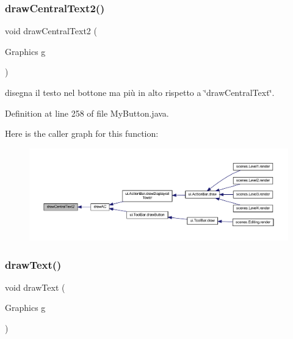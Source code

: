 \subsubsection{\texorpdfstring{draw\+Central\+Text2()}{drawCentralText2()}}
{\footnotesize\ttfamily void draw\+Central\+Text2 (\begin{DoxyParamCaption}\item[{Graphics}]{g }\end{DoxyParamCaption})\hspace{0.3cm}{\ttfamily [private]}}



disegna il testo nel bottone ma più in alto rispetto a \char`\"{}draw\+Central\+Text\char`\"{}. 



Definition at line 258 of file My\+Button.\+java.

Here is the caller graph for this function\+:\nopagebreak
\begin{figure}[H]
\begin{center}
\leavevmode
\includegraphics[width=350pt]{classui_1_1_my_button_a5d567e88f76d588ff4af3357a5db4f9c_icgraph}
\end{center}
\end{figure}
\mbox{\label{classui_1_1_my_button_a8df311009317d839a01870ceac76eb75}} 
\subsubsection{\texorpdfstring{draw\+Text()}{drawText()}}
{\footnotesize\ttfamily void draw\+Text (\begin{DoxyParamCaption}\item[{Graphics}]{g }\end{DoxyParamCaption})\hspace{0.3cm}{\ttfamily [private]}}



